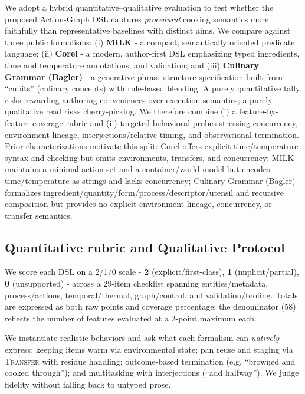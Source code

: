 \documentclass[sigconf]{acmart}
\begin{document}
We adopt a hybrid quantitative–qualitative evaluation to test whether the proposed Action-Graph DSL captures \emph{procedural} cooking semantics more faithfully than representative baselines with distinct aims. We compare against three public formalisms: (i) \textbf{MILK} \cite{tasse2008sourcream} - a compact, semantically oriented predicate language; (ii) \textbf{Corel} \cite{roorda2021corel} - a modern, author-first DSL emphasizing typed ingredients, time and temperature annotations, and validation; and (iii) \textbf{Culinary Grammar (Bagler)} \cite{bagler2022generative} - a generative phrase-structure specification built from ``cubits'' (culinary concepts) with rule-based blending. A purely quantitative tally risks rewarding authoring conveniences over execution semantics; a purely qualitative read risks cherry-picking. We therefore combine (i) a feature-by-feature coverage rubric and (ii) targeted behavioral probes stressing concurrency, environment lineage, interjections/relative timing, and observational termination. Prior characterizations motivate this split: Corel offers explicit time/temperature syntax and checking but omits environments, transfers, and concurrency; MILK maintains a minimal action set and a container/world model but encodes time/temperature as strings and lacks concurrency; Culinary Grammar (Bagler) formalizes ingredient/quantity/form/process/descriptor/utensil and recursive composition but provides no explicit environment lineage, concurrency, or transfer semantics.

\subsection{Quantitative rubric and Qualitative Protocol}

We score each DSL on a 2/1/0 scale - \textbf{2} (explicit/first-class), \textbf{1} (implicit/partial), \textbf{0} (unsupported) - across a 29-item checklist spanning entities/metadata, process/actions, temporal/thermal, graph/control, and validation/tooling. Totals are expressed as both raw points and coverage percentage; the denominator (58) reflects the number of features evaluated at a 2-point maximum each.

We instantiate realistic behaviors and ask what each formalism can \emph{natively} express: keeping items warm via environmental state; pan reuse and staging via \textsc{Transfer} with residue handling; outcome-based termination (e.g. ``browned and cooked through''); and multitasking with interjections (``add halfway''). We judge fidelity without falling back to untyped prose.
\end{document}
